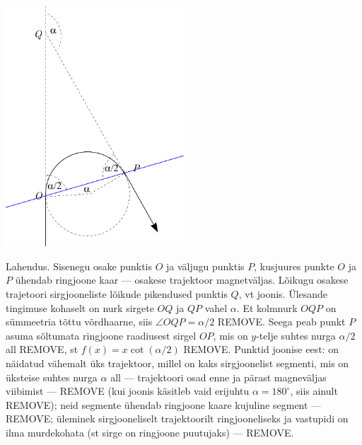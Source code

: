 \documentclass[10pt]{article}
\newcommand{\pp}[1]{REMOVE}
\begin{document}
\solu
\vspace{-10pt}
  \begin{center}
    \includegraphics[width=0.5\textwidth]{2020-v2g-09-yl.pdf}
  \end{center}
  \vspace{-10pt}
Lahendus. Sisenegu osake punktis $O$ ja väljugu punktis $P$, kusjuures punkte $O$ ja $P$ ühendab ringjoone kaar --- osakese trajektoor magnetväljas. Lõikugu osakese trajetoori sirgjooneliste lõikude pikendused punktis $Q$, vt joonis. Ülesande tingimuse kohaselt on nurk sirgete $OQ$ ja $QP$ vahel $\alpha$. Et kolmnurk $OQP$ on sümmeetria tõttu võrdhaarne, siis $\angle OQP=\alpha/2$  \pp{3}. Seega peab punkt $P$ asuma sõltumata ringjoone raadiusest sirgel $OP$, mis on $y$-telje suhtes nurga $\alpha/2$ all  \pp{2}, st $f(x)=x\cot(\alpha/2)$  \pp{1}. Punktid joonise eest: on näidatud vähemalt üks trajektoor, millel on kaks sirgjoonelist segmenti, mis on üksteise suhtes nurga $\alpha$ all --- trajektoori osad enne ja pärast magneväljas viibimist --- \pp{2} (kui joonis käsitleb vaid erijuhtu $\alpha=180^\circ$, siis ainult \pp{1}); neid segmente ühendab ringjoone kaare kujuline segment --- \pp{2}; üleminek sirgjooneliselt trajektoorilt ringjooneliseks ja vastupidi on ilma murdekohata (st sirge on ringjoone puutujaks) --- \pp{2}.

\vspace{10pt}
\probend
\bigskip

\setAuthor{}
\end{document}
